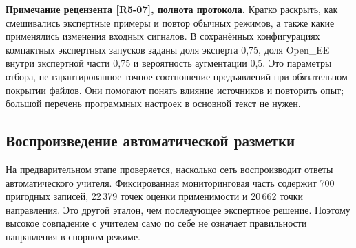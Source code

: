 {}

\ifdefined\AuthorReview
\par\smallskip\begingroup\small\raggedright\color{red!60!black}
\noindent\textbf{Примечание рецензента [R5-07], полнота протокола.} Кратко раскрыть, как смешивались экспертные примеры и повтор обычных режимов, а также какие применялись изменения входных сигналов. В сохранённых конфигурациях компактных экспертных запусков заданы доля эксперта 0,75, доля Open\_EE внутри экспертной части 0,75 и вероятность аугментации 0,5. Это параметры отбора, не гарантированное точное соотношение предъявлений при обязательном покрытии файлов. Они помогают понять влияние источников и повторить опыт; большой перечень программных настроек в основной текст не нужен.\par\endgroup\smallskip
\fi
\ifdefined\AuthorReview
\par{}\smallskip
\fi

\subsection{Воспроизведение автоматической разметки}
\label{sec:ch5_weak_monitoring}

На предварительном этапе проверяется,
насколько сеть воспроизводит ответы автоматического учителя.
Фиксированная мониторинговая часть содержит 700 пригодных
записей, 22\,379 точек оценки применимости
и 20\,662 точки направления.
Это другой эталон, чем последующее экспертное решение.
Поэтому высокое совпадение с учителем само по себе
не означает правильности направления в спорном режиме.

{}

